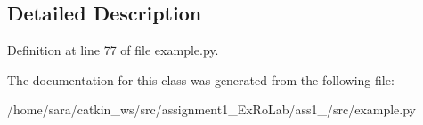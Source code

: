 \subsection{Detailed Description}


Definition at line 77 of file example.\+py.



The documentation for this class was generated from the following file\+:\begin{DoxyCompactItemize}
\item 
/home/sara/catkin\+\_\+ws/src/assignment1\+\_\+\+Ex\+Ro\+Lab/ass1\+\_/src/example.\+py\end{DoxyCompactItemize}
